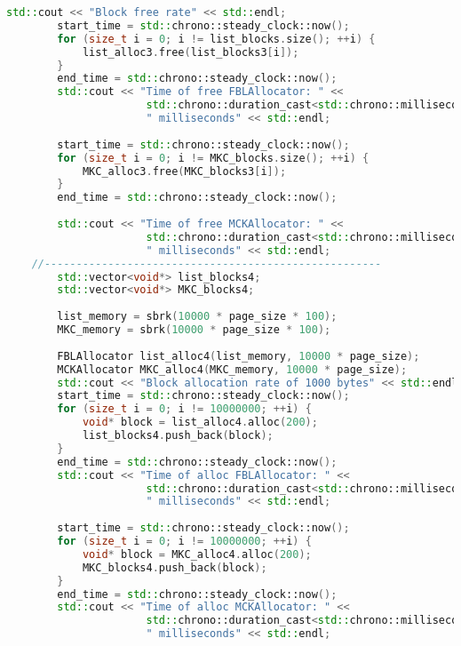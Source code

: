 \documentclass[a4paper, 12pt]{article}
\begin{document}
\begin{lstlisting}[language=C++]
        std::cout << "Block free rate" << std::endl;
        start_time = std::chrono::steady_clock::now();
        for (size_t i = 0; i != list_blocks.size(); ++i) {
            list_alloc3.free(list_blocks3[i]);
        }
        end_time = std::chrono::steady_clock::now();
        std::cout << "Time of free FBLAllocator: " << 
                      std::chrono::duration_cast<std::chrono::milliseconds>(end_time - start_time).count() << 
                      " milliseconds" << std::endl;
    
        start_time = std::chrono::steady_clock::now();
        for (size_t i = 0; i != MKC_blocks.size(); ++i) {
            MKC_alloc3.free(MKC_blocks3[i]);
        }
        end_time = std::chrono::steady_clock::now();
    
        std::cout << "Time of free MCKAllocator: " << 
                      std::chrono::duration_cast<std::chrono::milliseconds>(end_time - start_time).count() << 
                      " milliseconds" << std::endl;
    //-----------------------------------------------------
        std::vector<void*> list_blocks4;
        std::vector<void*> MKC_blocks4;
    
        list_memory = sbrk(10000 * page_size * 100); 
        MKC_memory = sbrk(10000 * page_size * 100);
    
        FBLAllocator list_alloc4(list_memory, 10000 * page_size);
        MCKAllocator MKC_alloc4(MKC_memory, 10000 * page_size);
        std::cout << "Block allocation rate of 1000 bytes" << std::endl;
        start_time = std::chrono::steady_clock::now();
        for (size_t i = 0; i != 10000000; ++i) {
            void* block = list_alloc4.alloc(200);
            list_blocks4.push_back(block);
        }
        end_time = std::chrono::steady_clock::now();
        std::cout << "Time of alloc FBLAllocator: " << 
                      std::chrono::duration_cast<std::chrono::milliseconds>(end_time - start_time).count() << 
                      " milliseconds" << std::endl;
    
        start_time = std::chrono::steady_clock::now();
        for (size_t i = 0; i != 10000000; ++i) {
            void* block = MKC_alloc4.alloc(200);
            MKC_blocks4.push_back(block);
        }
        end_time = std::chrono::steady_clock::now();
        std::cout << "Time of alloc MCKAllocator: " << 
                      std::chrono::duration_cast<std::chrono::milliseconds>(end_time - start_time).count() << 
                      " milliseconds" << std::endl;
    

\end{lstlisting}
\end{document}
